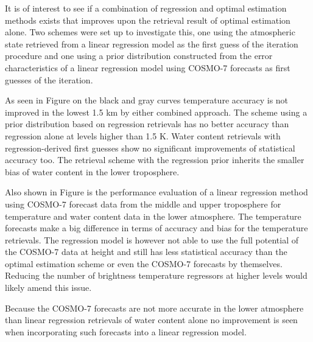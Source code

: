 \stopsubsection

\startsubsection[title={Combined Approaches}]

    It is of interest to see if a combination of regression and optimal
    estimation methods exists that improves upon the retrieval result of
    optimal estimation alone. Two schemes were set up to investigate this,
    one using the atmospheric state retrieved from a linear regression model
    as the first guess of the iteration procedure and one using a prior
    distribution constructed from the error characteristics of a linear
    regression model using COSMO-7 forecasts as first guesses of the iteration.

    As seen in Figure  on the black and gray curves
    temperature accuracy is not improved in the lowest 1.5 km by either
    combined approach. The scheme using a prior distribution based on
    regression retrievals has no better accuracy than regression alone at
    levels higher than 1.5 K. Water content retrievals with regression-derived
    first guesses show no significant improvements of statistical accuracy too.
    The retrieval scheme with the regression prior inherits the smaller
    bias of water content in the lower troposphere.

    Also shown in Figure  is the performance evaluation of
    a linear regression method using COSMO-7 forecast data from the middle and
    upper troposphere for temperature and water content data in the lower
    atmosphere. The temperature forecasts make a big difference in terms of
    accuracy and bias for the temperature retrievals. The regression model
    is however not able to use the full potential of the COSMO-7 data at
    height and still has less statistical accuracy than the optimal estimation
    scheme or even the COSMO-7 forecasts by themselves. Reducing the number of
    brightness temperature regressors at higher levels would likely amend this
    issue.

    Because the COSMO-7 forecasts are not more accurate in the lower atmosphere
    than linear regression retrievals of water content alone no improvement
    is seen when incorporating such forecasts into a linear regression model.

